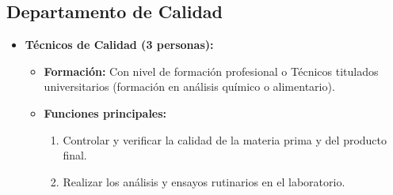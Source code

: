 \subsection{Departamento de Calidad}
\begin{itemize}[leftmargin=*]
    \item \textbf{Técnicos de Calidad (3 personas):}
          \begin{itemize}
              \item \textbf{Formación:} Con nivel de formación profesional o Técnicos titulados universitarios (formación en análisis químico o alimentario).
              \item \textbf{Funciones principales:}
                    \begin{enumerate}
                        \item Controlar y verificar la calidad de la materia prima y del producto final.
                        \item Realizar los análisis y ensayos rutinarios en el laboratorio.
                    \end{enumerate}
          \end{itemize}
\end{itemize}

